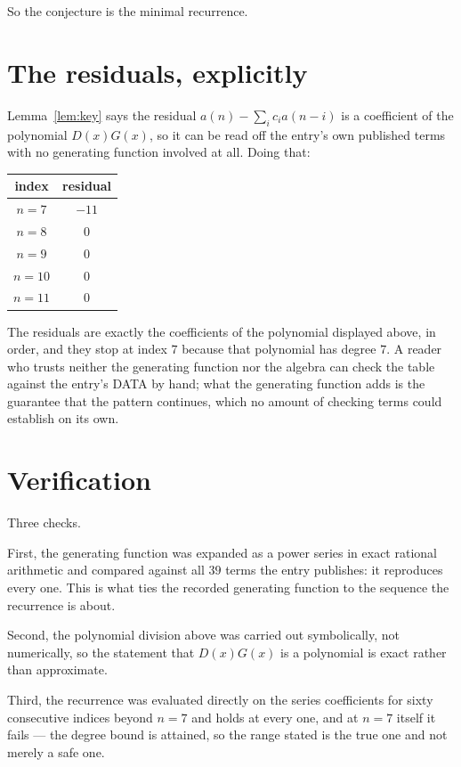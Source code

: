 \documentclass[11pt,a4paper]{article}
\theoremstyle{plain}
\theoremstyle{definition}
\begin{document}
So the conjecture is the minimal recurrence.

\section{The residuals, explicitly}

Lemma~\ref{lem:key} says the residual $a(n)-\sum_ic_ia(n-i)$ is a coefficient of the
polynomial $D(x)G(x)$, so it can be read off the entry's own published terms with no
generating function involved at all. Doing that:
\begin{center}
\begin{tabular}{cc}
index & residual \\ \hline
$n=7$ & $-11$ \\
$n=8$ & $0$ \\
$n=9$ & $0$ \\
$n=10$ & $0$ \\
$n=11$ & $0$
\end{tabular}
\end{center}
The residuals are exactly the coefficients of the polynomial displayed above, in order, and
they stop at index $7$ because that polynomial has degree $7$. A reader who trusts
neither the generating function nor the algebra can check the table against the entry's DATA
by hand; what the generating function adds is the guarantee that the pattern continues, which
no amount of checking terms could establish on its own.

\section{Verification}

Three checks.

First, the generating function was expanded as a power series in exact rational arithmetic and
compared against all $39$ terms the entry publishes: it reproduces every one. This is
what ties the recorded generating function to the sequence the recurrence is about.

Second, the polynomial division above was carried out symbolically, not numerically, so the
statement that $D(x)G(x)$ is a polynomial is exact rather than approximate.

Third, the recurrence was evaluated directly on the series coefficients for sixty consecutive
indices beyond $n=7$ and holds at every one, and at $n=7$ itself it fails --- the
degree bound is attained, so the range stated is the true one and not merely a safe one.
\end{document}
